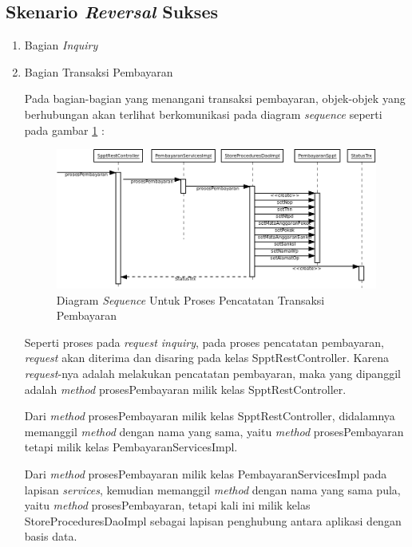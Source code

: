 \subsection{Skenario \textit{Reversal} Sukses}

\begin{enumerate}
  
  
  \item Bagian \textit{Inquiry}
  
  
  
  \item Bagian Transaksi Pembayaran
  
  Pada bagian-bagian yang menangani transaksi pembayaran, objek-objek yang berhubungan akan terlihat berkomunikasi pada diagram \textit{sequence} seperti pada gambar \ref{fig:uml-seq-trx} :
  
  \begin{figure}[H]
    \centering
    \includegraphics[width=1\textwidth]{./resources/uml/uml-seq-trx}
    \caption{Diagram \textit{Sequence} Untuk Proses Pencatatan Transaksi Pembayaran}
    \label{fig:uml-seq-trx}
  \end{figure}
  
  Seperti proses pada \textit{request inquiry}, pada proses pencatatan pembayaran, \textit{request} akan diterima dan disaring pada kelas SpptRestController. Karena \textit{request}-nya adalah melakukan pencatatan pembayaran, maka yang dipanggil adalah \textit{method} prosesPembayaran milik kelas SpptRestController.
  
  Dari \textit{method} prosesPembayaran milik kelas SpptRestController, didalamnya memanggil \textit{method} dengan nama yang sama, yaitu \textit{method} prosesPembayaran tetapi milik kelas PembayaranServicesImpl. 
  
  Dari \textit{method} prosesPembayaran milik kelas PembayaranServicesImpl pada lapisan \textit{services}, kemudian memanggil \textit{method} dengan nama yang sama pula, yaitu \textit{method} prosesPembayaran, tetapi kali ini milik kelas StoreProceduresDaoImpl sebagai lapisan penghubung antara aplikasi dengan basis data.
  

\end{enumerate}

